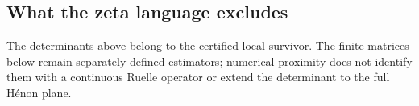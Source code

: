 \subsection{What the zeta language excludes}

The determinants above belong to the certified local survivor.  The finite
matrices below remain separately defined estimators; numerical proximity does
not identify them with a continuous Ruelle operator or extend the determinant
to the full H\'enon plane.

